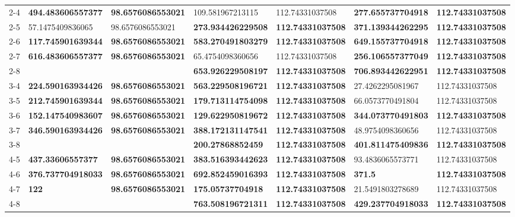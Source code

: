 \begin{table}[ht]
\begin{tabular}{rllllll}
  2-4 & \textbf{494.483606557377} & \textbf{98.6576086553021} & 109.581967213115 & 112.74331037508 & \textbf{277.655737704918} & \textbf{112.74331037508} \\ 
  2-5 & 57.1475409836065 & 98.6576086553021 & \textbf{273.934426229508} & \textbf{112.74331037508} & \textbf{371.139344262295} & \textbf{112.74331037508} \\ 
  2-6 & \textbf{117.745901639344} & \textbf{98.6576086553021} & \textbf{583.270491803279} & \textbf{112.74331037508} & \textbf{649.155737704918} & \textbf{112.74331037508} \\ 
  2-7 & \textbf{616.483606557377} & \textbf{98.6576086553021} & 65.4754098360656 & 112.74331037508 & \textbf{256.106557377049} & \textbf{112.74331037508} \\ 
  2-8 &  &  & \textbf{653.926229508197} & \textbf{112.74331037508} & \textbf{706.893442622951} & \textbf{112.74331037508} \\ 
  3-4 & \textbf{224.590163934426} & \textbf{98.6576086553021} & \textbf{563.229508196721} & \textbf{112.74331037508} & 27.4262295081967 & 112.74331037508 \\ 
  3-5 & \textbf{212.745901639344} & \textbf{98.6576086553021} & \textbf{179.713114754098} & \textbf{112.74331037508} & 66.0573770491804 & 112.74331037508 \\ 
  3-6 & \textbf{152.147540983607} & \textbf{98.6576086553021} & \textbf{129.622950819672} & \textbf{112.74331037508} & \textbf{344.073770491803} & \textbf{112.74331037508} \\ 
  3-7 & \textbf{346.590163934426} & \textbf{98.6576086553021} & \textbf{388.172131147541} & \textbf{112.74331037508} & 48.9754098360656 & 112.74331037508 \\ 
  3-8 &  &  & \textbf{200.27868852459} & \textbf{112.74331037508} & \textbf{401.811475409836} & \textbf{112.74331037508} \\ 
  4-5 & \textbf{437.33606557377} & \textbf{98.6576086553021} & \textbf{383.516393442623} & \textbf{112.74331037508} & 93.4836065573771 & 112.74331037508 \\ 
  4-6 & \textbf{376.737704918033} & \textbf{98.6576086553021} & \textbf{692.852459016393} & \textbf{112.74331037508} & \textbf{371.5} & \textbf{112.74331037508} \\ 
  4-7 & \textbf{122} & \textbf{98.6576086553021} & \textbf{175.05737704918} & \textbf{112.74331037508} & 21.5491803278689 & 112.74331037508 \\ 
  4-8 &  &  & \textbf{763.508196721311} & \textbf{112.74331037508} & \textbf{429.237704918033} & \textbf{112.74331037508} \\ 

\end{tabular}
\end{table}
